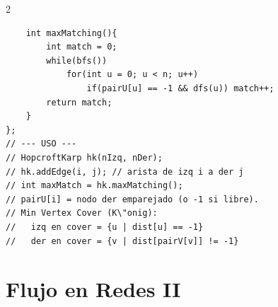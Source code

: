 \documentclass[10pt,a4paper]{article}
\begin{document}
\begin{multicols}{2}
\begin{lstlisting}
    int maxMatching(){
        int match = 0;
        while(bfs())
            for(int u = 0; u < n; u++)
                if(pairU[u] == -1 && dfs(u)) match++;
        return match;
    }
};
// --- USO ---
// HopcroftKarp hk(nIzq, nDer);
// hk.addEdge(i, j); // arista de izq i a der j
// int maxMatch = hk.maxMatching();
// pairU[i] = nodo der emparejado (o -1 si libre).
// Min Vertex Cover (K\"onig):
//   izq en cover = {u | dist[u] == -1}
//   der en cover = {v | dist[pairV[v]] != -1}
\end{lstlisting}

\end{multicols}
\newpage

\section{Flujo en Redes II}
\end{document}
